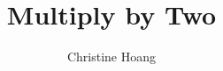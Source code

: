 \documentclass{article}
\title{Multiply by Two}
\author{Christine Hoang}
\begin{document}
\maketitle

\section{}
\end{document}
